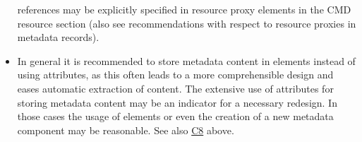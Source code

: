 \begin{itemize}
  references may be explicitly specified in resource proxy elements in
  the CMD resource section (also see recommendations with respect to
  resource proxies in metadata records).
\item
  In general it is recommended to store metadata content in elements
  instead of using attributes, as this often leads to a more
  comprehensible design and eases automatic extraction of content. The
  extensive use of attributes for storing metadata content may be an
  indicator for a necessary redesign. In those cases the usage of
  elements or even the creation of a new metadata component may be
  reasonable. See also
  \href{/modelling_component_metadata/components.md\#c8}{C8} above.
\end{itemize}
